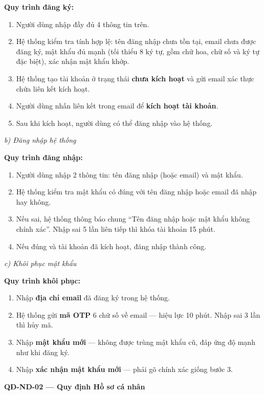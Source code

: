 \documentclass[12pt,a4paper]{article}
\begin{document}
\noindent\textbf{Quy trình đăng ký:}
\begin{enumerate}
    \item Người dùng nhập đầy đủ 4 thông tin trên.
    \item Hệ thống kiểm tra tính hợp lệ: tên đăng nhập chưa tồn tại, email chưa được đăng ký, mật khẩu đủ mạnh (tối thiểu 8 ký tự, gồm chữ hoa, chữ số và ký tự đặc biệt), xác nhận mật khẩu khớp.
    \item Hệ thống tạo tài khoản ở trạng thái \textbf{chưa kích hoạt} và gửi email xác thực chứa liên kết kích hoạt.
    \item Người dùng nhấn liên kết trong email để \textbf{kích hoạt tài khoản}.
    \item Sau khi kích hoạt, người dùng có thể đăng nhập vào hệ thống.
\end{enumerate}

\noindent\textit{b) Đăng nhập hệ thống}

\noindent\textbf{Quy trình đăng nhập:}
\begin{enumerate}
    \item Người dùng nhập 2 thông tin: tên đăng nhập (hoặc email) và mật khẩu.
    \item Hệ thống kiểm tra mật khẩu có đúng với tên đăng nhập hoặc email đã nhập hay không.
    \item Nếu sai, hệ thống thông báo chung ``Tên đăng nhập hoặc mật khẩu không chính xác''. Nhập sai 5 lần liên tiếp thì khóa tài khoản 15 phút.
    \item Nếu đúng và tài khoản đã kích hoạt, đăng nhập thành công.
\end{enumerate}

\noindent\textit{c) Khôi phục mật khẩu}

\noindent\textbf{Quy trình khôi phục:}
\begin{enumerate}
    \item Nhập \textbf{địa chỉ email} đã đăng ký trong hệ thống.
    \item Hệ thống gửi \textbf{mã OTP} 6 chữ số về email --- hiệu lực 10 phút. Nhập sai 3 lần thì hủy mã.
    \item Nhập \textbf{mật khẩu mới} --- không được trùng mật khẩu cũ, đáp ứng độ mạnh như khi đăng ký.
    \item Nhập \textbf{xác nhận mật khẩu mới} --- phải gõ chính xác giống bước 3.
\end{enumerate}

\vspace{0.3cm}
\noindent\textbf{QĐ-ND-02 --- Quy định Hồ sơ cá nhân}
\end{document}

